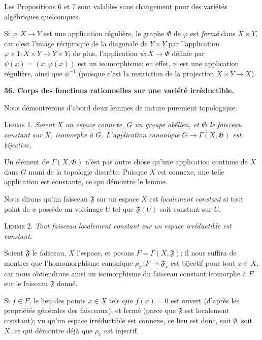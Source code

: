 Les Propositions 6 et 7 sont valables sans changement pour des variétés algébriques quelconques.

Si $\varphi : X \to Y$ est une application régulière, le graphe $\Phi$ de $\varphi$ est \textit{fermé} dans $X \times Y$, car c'est l'image réciproque de la diagonale de $Y \times Y$ par l'application $\varphi \times 1 : X \times Y \to Y \times Y$; de plus, l'application $\psi : X \to \Phi$ définie par $\psi(x) = (x, \varphi(x))$ est un isomorphisme: en effet, $\psi$ est une application régulière, ainsi que $\psi^{-1}$ (puisque c'est la restriction de la projection $X \times Y \to X$).


\textbf{36. Corps des fonctions rationnelles sur une variété irréductible.}

Nous démontrerons d'abord deux lemmes de nature purement topologique:



\textsc{Lemme} 1. \textit{Soient $X$ un espace connexe, $G$ un groupe abélien, et $\mathfrak{G}$ le faisceau constant sur $X$, isomorphe à $G$. L'application canonique $G \to \Gamma(X, \mathfrak{G})$ est bijective.}

Un élément de $\Gamma(X, \mathfrak{G})$ n'est pas autre chose qu'une application continue de $X$ dans $G$ muni de la topologie discrète. Puisque $X$ est connexe, une telle application est constante, ce qui démontre le lemme.

Nous dirons qu'un faisceau $\mathfrak{F}$ sur un espace $X$ est \textit{localement constant} si tout point de $x$ possède un voisinage $U$ tel que $\mathfrak{F}(U)$ soit constant sur $U$.

\textsc{Lemme} 2. \textit{Tout faisceau localement constant sur un espace irréductible est constant.}

Soient $\mathfrak{F}$ le faisceau, $X$ l'espace, et posons $F = \Gamma(X, \mathfrak{F})$; il nous suffira de montrer que l'homomorphisme canonique $\rho_x\colon F \to \mathfrak{F}_x$ est bijectif pour tout $x \in X$, car nous obtiendrons ainsi un isomorphisme du faisceau constant isomorphe à $F$ sur le faisceau $\mathfrak{F}$ donné.

Si $f \in F$, le lieu des points $x \in X$ tels que $f(x) = 0$ est ouvert (d'après les propriétés générales des faisceaux), et fermé (parce que $\mathfrak{F}$ est localement constant); vu qu'un espace irréductible est connexe, ce lieu est donc, soit $\emptyset$, soit $X$, ce qui démontre déjà que $\rho_x$ est injectif.

